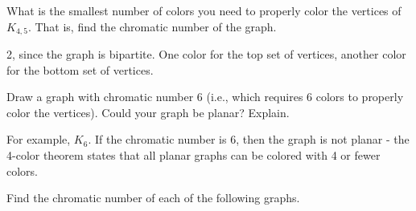 \begin{questions}


\question What is the smallest number of colors you need to properly color the vertices of $K_{4,5}$.  That is, find the chromatic number of the graph.

	\begin{answer}
		2, since the graph is bipartite.  One color for the top set of vertices, another color for the bottom set of vertices.  %
	\end{answer}
	
	



\question Draw a graph with chromatic number 6 (i.e., which requires 6 colors to properly color the vertices).  Could your graph be planar?  Explain.

	\begin{answer}
		For example, $K_6$.  If the chromatic number is 6, then the graph is not planar - the 4-color theorem states that all planar graphs can be colored with 4 or fewer colors. %
	\end{answer}
	
	
	



\question Find the chromatic number of each of the following graphs.

\begin{center}
  \hfill
  \hfill 
  \hfill
  \hfill
\end{center}


\end{questions}
